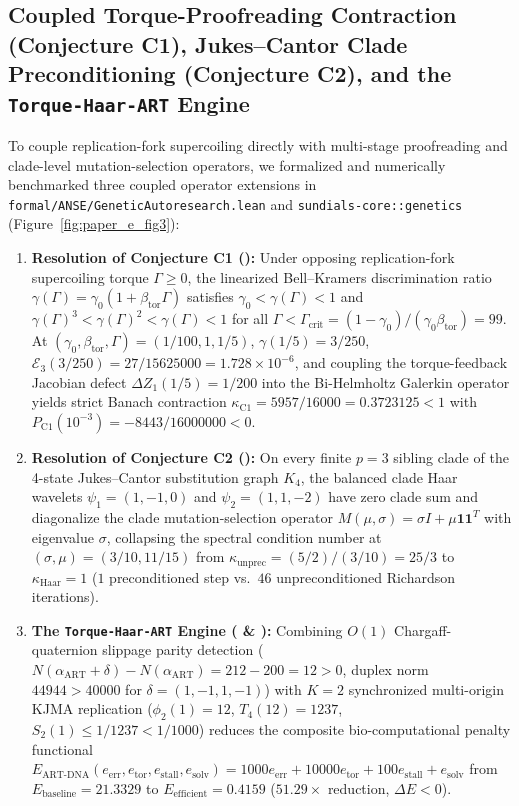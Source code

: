 \documentclass[11pt,a4paper]{article}
\theoremstyle{definition}
\begin{document}
\subsection{Coupled Torque-Proofreading Contraction (Conjecture C1), Jukes--Cantor Clade Preconditioning (Conjecture C2), and the \texttt{Torque-Haar-ART} Engine}

To couple replication-fork supercoiling directly with multi-stage proofreading and clade-level mutation-selection operators, we formalized and numerically benchmarked three coupled operator extensions in \texttt{formal/ANSE/GeneticAutoresearch.lean} and \texttt{sundials-core::genetics} (Figure~\ref{fig:paper_e_fig3}):
\begin{enumerate}
  \item \textbf{Resolution of Conjecture C1 ():} Under opposing replication-fork supercoiling torque $\Gamma \ge 0$, the linearized Bell--Kramers discrimination ratio $\gamma(\Gamma) = \gamma_0(1 + \beta_{\mathrm{tor}}\Gamma)$ satisfies $\gamma_0 < \gamma(\Gamma) < 1$ and $\gamma(\Gamma)^3 < \gamma(\Gamma)^2 < \gamma(\Gamma) < 1$ for all $\Gamma < \Gamma_{\mathrm{crit}} = (1-\gamma_0)/(\gamma_0\beta_{\mathrm{tor}}) = 99$. At $(\gamma_0, \beta_{\mathrm{tor}}, \Gamma) = (1/100, 1, 1/5)$, $\gamma(1/5) = 3/250$, $\mathcal{E}_3(3/250) = 27/15625000 = 1.728\times 10^{-6}$, and coupling the torque-feedback Jacobian defect $\Delta Z_1(1/5) = 1/200$ into the Bi-Helmholtz Galerkin operator yields strict Banach contraction $\kappa_{\mathrm{C1}} = 5957/16000 = 0.3723125 < 1$ with $P_{\mathrm{C1}}(10^{-3}) = -8443/16000000 < 0$.
  \item \textbf{Resolution of Conjecture C2 ():} On every finite $p=3$ sibling clade of the 4-state Jukes--Cantor substitution graph $K_4$, the balanced clade Haar wavelets $\psi_1 = (1,-1,0)$ and $\psi_2 = (1,1,-2)$ have zero clade sum and diagonalize the clade mutation-selection operator $M(\mu,\sigma) = \sigma I + \mu \mathbf{1}\mathbf{1}^T$ with eigenvalue $\sigma$, collapsing the spectral condition number at $(\sigma,\mu) = (3/10, 11/15)$ from $\kappa_{\mathrm{unprec}} = (5/2)/(3/10) = 25/3$ to $\kappa_{\mathrm{Haar}} = 1$ ($1$ preconditioned step vs.\ $46$ unpreconditioned Richardson iterations).
  \item \textbf{The \texttt{Torque-Haar-ART} Engine ( \& ):} Combining $O(1)$ Chargaff-quaternion slippage parity detection ($N(\alpha_{\mathrm{ART}}+\delta) - N(\alpha_{\mathrm{ART}}) = 212 - 200 = 12 > 0$, duplex norm $44944 > 40000$ for $\delta = (1,-1,1,-1)$) with $K=2$ synchronized multi-origin KJMA replication ($\phi_2(1) = 12$, $T_4(12) = 1237$, $S_2(1) \le 1/1237 < 1/1000$) reduces the composite bio-computational penalty functional $E_{\mathrm{ART\text{-}DNA}}(e_{\mathrm{err}}, e_{\mathrm{tor}}, e_{\mathrm{stall}}, e_{\mathrm{solv}}) = 1000 e_{\mathrm{err}} + 10000 e_{\mathrm{tor}} + 100 e_{\mathrm{stall}} + e_{\mathrm{solv}}$ from $E_{\mathrm{baseline}} = 21.3329$ to $E_{\mathrm{efficient}} = 0.4159$ ($51.29\times$ reduction, $\Delta E < 0$).

\end{enumerate}
\end{document}
